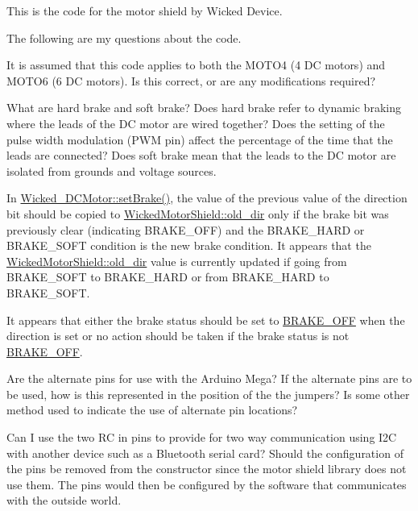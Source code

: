 This is the code for the motor shield by Wicked Device.

The following are my questions about the code.
\begin{DoxyItemize}
\item It is assumed that this code applies to both the M\+O\+T\+O4 (4 DC motors) and M\+O\+T\+O6 (6 DC motors). Is this correct, or are any modifications required?
\item What are hard brake and soft brake? Does hard brake refer to dynamic braking where the leads of the DC motor are wired together? Does the setting of the pulse width modulation (P\+WM pin) affect the percentage of the time that the leads are connected? Does soft brake mean that the leads to the DC motor are isolated from grounds and voltage sources.
\item In \mbox{\hyperlink{class_wicked___d_c_motor_a39e60ca4084d3134ec693815fe2154e1}{Wicked\+\_\+\+D\+C\+Motor\+::set\+Brake()}}, the value of the previous value of the direction bit should be copied to \mbox{\hyperlink{class_wicked_motor_shield_aac68eff7dd860f3811be0f290d70c0bc}{Wicked\+Motor\+Shield\+::old\+\_\+dir}} only if the brake bit was previously clear (indicating B\+R\+A\+K\+E\+\_\+\+O\+FF) and the B\+R\+A\+K\+E\+\_\+\+H\+A\+RD or B\+R\+A\+K\+E\+\_\+\+S\+O\+FT condition is the new brake condition. It appears that the \mbox{\hyperlink{class_wicked_motor_shield_aac68eff7dd860f3811be0f290d70c0bc}{Wicked\+Motor\+Shield\+::old\+\_\+dir}} value is currently updated if going from B\+R\+A\+K\+E\+\_\+\+S\+O\+FT to B\+R\+A\+K\+E\+\_\+\+H\+A\+RD or from B\+R\+A\+K\+E\+\_\+\+H\+A\+RD to B\+R\+A\+K\+E\+\_\+\+S\+O\+FT.
\item It appears that either the brake status should be set to \mbox{\hyperlink{_wicked_motor_shield_8h_ad52174b3c7a0600af22b33b0f180eb67}{B\+R\+A\+K\+E\+\_\+\+O\+FF}} when the direction is set or no action should be taken if the brake status is not \mbox{\hyperlink{_wicked_motor_shield_8h_ad52174b3c7a0600af22b33b0f180eb67}{B\+R\+A\+K\+E\+\_\+\+O\+FF}}.
\item Are the alternate pins for use with the Arduino Mega? If the alternate pins are to be used, how is this represented in the position of the the jumpers? Is some other method used to indicate the use of alternate pin locations?
\item Can I use the two RC in pins to provide for two way communication using I2C with another device such as a Bluetooth serial card? Should the configuration of the pins be removed from the constructor since the motor shield library does not use them. The pins would then be configured by the software that communicates with the outside world. 
\end{DoxyItemize}